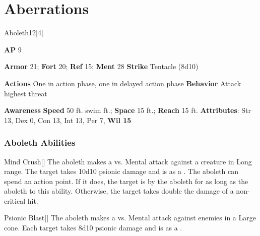 
\section{Aberrations}
\begin{monsection}{Aboleth}{12}[4]
\vspace{-1em}\vspace{-1em}
\begin{spellcontent}
\begin{spelltargetinginfo}
{\textbf{AP} 9}

\pari \textbf{Armor} 21;
\textbf{Fort} 20;
\textbf{Ref} 15;
\textbf{Ment} 28
\pari \textbf{Strike} Tentacle  (8d10)


\pari \textbf{Actions} One in action phase, one in delayed action phase
\pari \textbf{Behavior} Attack highest threat
\end{spelltargetinginfo}
\end{spellcontent}

\begin{monsterfooter}
\pari \textbf{Awareness} 
\pari \textbf{Speed} 50 ft. swim ft.;
\textbf{Space} 15 ft.;
\textbf{Reach} 15 ft.
\pari \textbf{Attributes}:
Str 13,
Dex 0,
Con 13,
Int 13,
Per 7,
\textbf{Wil 15}
\end{monsterfooter}
\end{monsection}


\subsubsection{Aboleth Abilities}

\begin{ability}{Mind Crush}[]
The aboleth makes a  vs. Mental attack against a creature in Long range.
\hit The target takes 10d10 psionic damage and is  as a .
\crit The aboleth can spend an action point.
If it does, the target is  by the aboleth for as long as the aboleth  to this ability.
Otherwise, the target takes double the damage of a non-critical hit.
\end{ability}

\vspace{0.5em}
\begin{ability}{Psionic Blast}[]
The aboleth makes a  vs. Mental attack against enemies in a Large cone.
\hit Each target takes 8d10 psionic damage and is  as a .
\end{ability}

